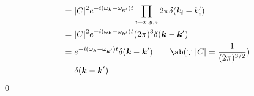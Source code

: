 \documentclass[uplatex,dvipdfmx,a4paper,11pt]{jlreq}
\makeatletter
\newcommand{\kk}{\bm{k}}
\numberwithin{equation}{section}
\theoremstyle{definition}
\renewenvironment{proof}[1][\proofname]{\par
  \normalfont
  \topsep6\p@\@plus6\p@ \trivlist
  \item[\hskip\labelsep{\bfseries #1}\@addpunct{\bfseries}]\ignorespaces\quad\par
}{%
  \qed\endtrivlist\@endpefalse
}
\renewcommand\proofname{証明}
\makeatother
\begin{document}
\begin{proof}
\begin{align}
                                                                         & = |C|^2e^{-i(\omega_{\kk} - \omega_{\kk'})t}\prod_{i=x,y,z}2\pi\delta(k_i - k_i')                                                              \\
                                                                         & = |C|^2e^{-i(\omega_{\kk} - \omega_{\kk'})t}(2\pi)^3\delta(\kk - \kk')                                                                         \\
                                                                         & = e^{-i(\omega_{\kk} - \omega_{\kk'})t}\delta(\kk - \kk') \qquad \ab(\because |C| = \frac{1}{(2\pi)^{3/2}})                                    \\
                                                                         & = \delta(\kk - \kk')
  \end{align}
\end{proof}
\end{document}
